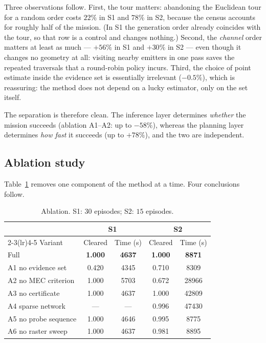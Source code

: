 \documentclass[journal,10pt]{IEEEtran}
\theoremstyle{definition}
\begin{document}
Three observations follow. First, the tour matters: abandoning the Euclidean tour for a random
order costs $22\%$ in S1 and $78\%$ in S2, because the census accounts for roughly half of the
mission. (In S1 the generation order already coincides with the tour, so that row is a control and
changes nothing.) Second, the \emph{channel} order matters at least as much --- $+56\%$ in S1 and
$+30\%$ in S2 --- even though it changes no geometry at all: visiting nearby emitters in one pass
saves the repeated traversals that a round-robin policy incurs. Third, the choice of point estimate
inside the evidence set is essentially irrelevant ($-0.5\%$), which is reassuring: the method does
not depend on a lucky estimator, only on the set itself.

The separation is therefore clean. The inference layer determines \emph{whether} the
mission succeeds (ablation A1--A2: up to $-58\%$), whereas the planning layer determines
\emph{how fast} it succeeds (up to $+78\%$), and the two are independent.

\subsection{Ablation study}
\label{sec:ablation}

Table~\ref{tab:abl} removes one component of the method at a time. Four conclusions follow.

\begin{table}[t]
\caption{Ablation. S1: $30$ episodes; S2: $15$ episodes.}
\label{tab:abl}
\centering
\small
\begin{tabular}{lcccc}
\toprule
& \multicolumn{2}{c}{S1} & \multicolumn{2}{c}{S2} \\
\cmidrule(lr){2-3}\cmidrule(lr){4-5}
Variant & Cleared & Time (s) & Cleared & Time (s) \\
\midrule
Full                 & \textbf{1.000} & \textbf{4637} & \textbf{1.000} & \textbf{8871} \\
A1 no evidence set   & 0.420 & 4345 & 0.710 & 8309 \\
A2 no MEC criterion  & 1.000 & 5703 & 0.672 & 28966 \\
A3 no certificate    & 1.000 & 4637 & 1.000 & 42809 \\
A4 sparse network    & ---   & ---  & 0.996 & 47430 \\
A5 no probe sequence & 1.000 & 4646 & 0.995 & 8775 \\
A6 no raster sweep   & 1.000 & 4637 & 0.981 & 8895 \\
\bottomrule
\end{tabular}
\end{table}
\end{document}
